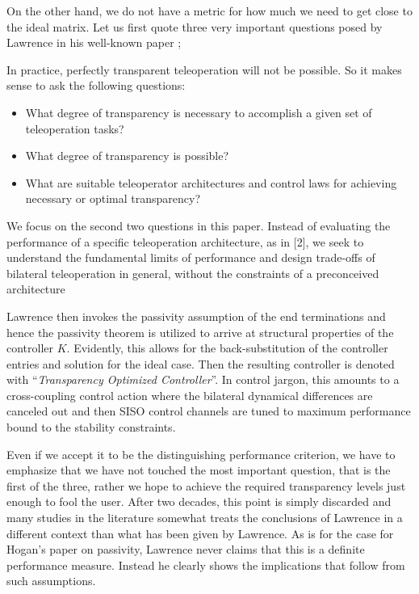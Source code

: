 On the other hand, we do not have a metric for how much we need to get close to the ideal matrix. Let us first quote three 
very important questions posed by Lawrence in his well-known paper \cite{lawrence};
\begin{displayquote}
In practice, perfectly transparent teleoperation will not be possible. So it makes sense to ask the following questions:
\begin{itemize}
	\item What degree of transparency is necessary to accomplish a given set of teleoperation tasks? 
	\item What degree of transparency is possible?
	\item What are suitable teleoperator architectures and control laws for achieving necessary or optimal transparency?
\end{itemize}
We focus on the second two questions in this paper. Instead of evaluating the performance of a specific teleoperation architecture,
as in [2], we seek to understand the fundamental limits of performance and design trade-offs of bilateral teleoperation in
general, without the constraints of a preconceived architecture
\end{displayquote}
Lawrence then invokes the passivity assumption of the end terminations and hence the passivity theorem is utilized to arrive at structural 
properties of the controller $K$. Evidently, this allows for the back-substitution of the controller entries and solution
for the ideal case. Then the resulting controller is denoted with \enquote{\emph{Transparency Optimized Controller}}. In 
control jargon, this amounts to a cross-coupling control action where the bilateral dynamical differences
are canceled out and then SISO control channels are tuned to maximum performance bound to the stability constraints. 

Even if we accept it to be the distinguishing performance criterion, we have to emphasize that we have not touched the most 
important question, that is the first of the three, rather we hope to achieve the required transparency levels just enough 
to fool the user. After two decades, this point is simply discarded and many studies in the literature somewhat 
treats the conclusions of Lawrence in a different context than what has been given by Lawrence. As is for the case for 
Hogan's paper on passivity, Lawrence never claims that this is a definite performance measure. Instead he clearly shows the 
implications that follow from such assumptions. 

